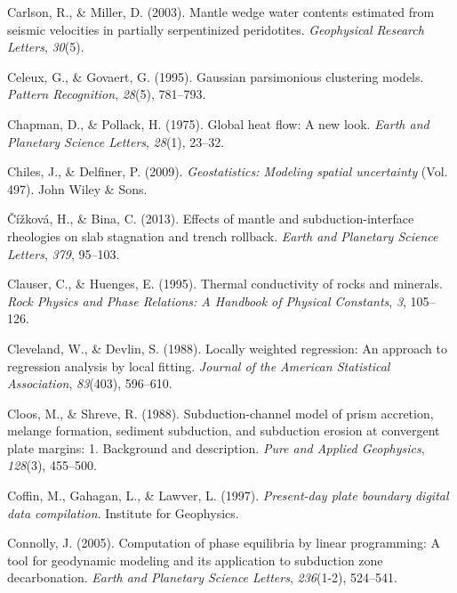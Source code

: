 \begin{CSLReferences}{1}{1}
\leavevmode{}%
Carlson, R., \& Miller, D. (2003). Mantle wedge water contents estimated from seismic velocities in partially serpentinized peridotites. \emph{Geophysical Research Letters}, \emph{30}(5).

\leavevmode{}%
Celeux, G., \& Govaert, G. (1995). Gaussian parsimonious clustering models. \emph{Pattern Recognition}, \emph{28}(5), 781--793.

\leavevmode{}%
Chapman, D., \& Pollack, H. (1975). Global heat flow: A new look. \emph{Earth and Planetary Science Letters}, \emph{28}(1), 23--32.

\leavevmode{}%
Chiles, J., \& Delfiner, P. (2009). \emph{Geostatistics: Modeling spatial uncertainty} (Vol. 497). John Wiley \& Sons.

\leavevmode{}%
Čížková, H., \& Bina, C. (2013). Effects of mantle and subduction-interface rheologies on slab stagnation and trench rollback. \emph{Earth and Planetary Science Letters}, \emph{379}, 95--103.

\leavevmode{}%
Clauser, C., \& Huenges, E. (1995). Thermal conductivity of rocks and minerals. \emph{Rock Physics and Phase Relations: A Handbook of Physical Constants}, \emph{3}, 105--126.

\leavevmode{}%
Cleveland, W., \& Devlin, S. (1988). Locally weighted regression: An approach to regression analysis by local fitting. \emph{Journal of the American Statistical Association}, \emph{83}(403), 596--610.

\leavevmode{}%
Cloos, M., \& Shreve, R. (1988). Subduction-channel model of prism accretion, melange formation, sediment subduction, and subduction erosion at convergent plate margins: 1. Background and description. \emph{Pure and Applied Geophysics}, \emph{128}(3), 455--500.

\leavevmode{}%
Coffin, M., Gahagan, L., \& Lawver, L. (1997). \emph{Present-day plate boundary digital data compilation}. Institute for Geophysics.

\leavevmode{}%
Connolly, J. (2005). Computation of phase equilibria by linear programming: A tool for geodynamic modeling and its application to subduction zone decarbonation. \emph{Earth and Planetary Science Letters}, \emph{236}(1-2), 524--541.


\end{CSLReferences}
